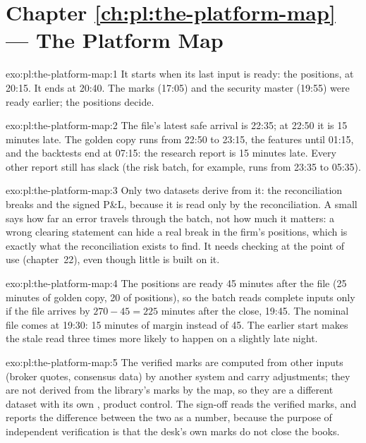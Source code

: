\section*{Chapter \ref{ch:pl:the-platform-map} --- The Platform Map}

\begin{solution}{exo:pl:the-platform-map:1}
It starts when its last input is ready: the positions, at 20:15. It ends at 20:40. The marks (17:05) and the security master
(19:55) were ready earlier; the positions decide.
\end{solution}

\begin{solution}{exo:pl:the-platform-map:2}
The file's latest safe arrival is 22:35; at 22:50 it is 15 minutes late. The golden copy runs from 22:50 to 23:15, the features
until 01:15, and the backtests end at 07:15: the research report is 15 minutes late. Every other report still has slack (the risk
batch, for example, runs from 23:35 to 05:35).
\end{solution}

\begin{solution}{exo:pl:the-platform-map:3}
Only two datasets derive from it: the reconciliation breaks and the signed P\&L, because it is read only by the reconciliation.
A small  says how far an error travels through the batch, not how much it matters: a wrong clearing statement can
hide a real break in the firm's positions, which is exactly what the reconciliation exists to find. It needs checking at the
point of use (chapter~22), even though little is built on it.
\end{solution}

\begin{solution}{exo:pl:the-platform-map:4}
The positions are ready 45 minutes after the file (25 minutes of golden copy, 20 of positions), so the batch reads complete
inputs only if the file arrives by $270 - 45 = 225$ minutes after the close, 19:45. The nominal file comes at 19:30: 15 minutes
of margin instead of 45. The earlier start makes the stale read three times more likely to happen on a slightly late night.
\end{solution}

\begin{solution}{exo:pl:the-platform-map:5}
The verified marks are computed from other inputs (broker quotes, consensus data) by another system and carry adjustments; they
are not derived from the library's marks by the map, so they are a different dataset with its own , product
control. The sign-off reads the verified marks, and reports the difference between the two as a number, because the purpose of
independent verification is that the desk's own marks do not close the books.
\end{solution}


